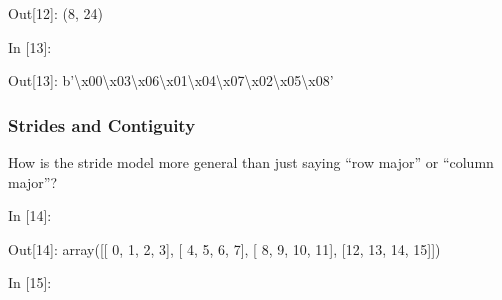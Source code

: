 \begin{BGVerbatim}[commandchars=\\\{\}]
{\color{outcolor}Out[{\color{outcolor}12}]:} (8, 24)
\end{BGVerbatim}
            
    \begin{BGVerbatim}[commandchars=\\\{\}]
{\color{incolor}In [{\color{incolor}13}]:} 
\end{BGVerbatim}

\begin{BGVerbatim}[commandchars=\\\{\}]
{\color{outcolor}Out[{\color{outcolor}13}]:} b'\textbackslash{}x00\textbackslash{}x03\textbackslash{}x06\textbackslash{}x01\textbackslash{}x04\textbackslash{}x07\textbackslash{}x02\textbackslash{}x05\textbackslash{}x08'
\end{BGVerbatim}
            
    \hypertarget{strides-and-contiguity}{%
\subsubsection{Strides and Contiguity}\label{strides-and-contiguity}}

    How is the stride model more general than just saying ``row major'' or
``column major''?

    \begin{BGVerbatim}[commandchars=\\\{\}]
{\color{incolor}In [{\color{incolor}14}]:}    
\end{BGVerbatim}

\begin{BGVerbatim}[commandchars=\\\{\}]
{\color{outcolor}Out[{\color{outcolor}14}]:} array([[ 0,  1,  2,  3],
                [ 4,  5,  6,  7],
                [ 8,  9, 10, 11],
                [12, 13, 14, 15]])
\end{BGVerbatim}
            
    \begin{BGVerbatim}[commandchars=\\\{\}]
{\color{incolor}In [{\color{incolor}15}]:} 
\end{BGVerbatim}

